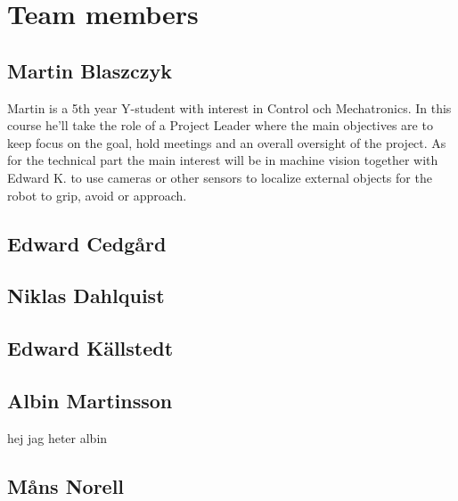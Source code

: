 \section{Team members}

\subsection{Martin Blaszczyk}
Martin is a 5th year Y-student with interest in Control och Mechatronics. 
In this course he'll take the role of a Project Leader where the main objectives
are to keep focus on the goal, hold meetings and an overall oversight of the project. 
As for the technical part the main interest will be in machine vision together with
Edward K. to use cameras or other sensors to localize external objects for the 
robot to grip, avoid or approach. 

\subsection{Edward Cedgård}

\subsection{Niklas Dahlquist}

\subsection{Edward Källstedt}

\subsection{Albin Martinsson} hej jag heter albin

\subsection{Måns Norell}










